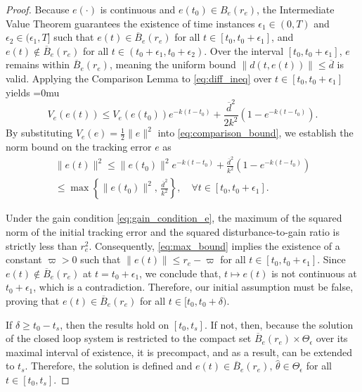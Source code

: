 \documentclass[conference]{ieeeconf}
\begin{document}
\begin{proof}
Because $e(\cdot)$ is continuous and $e(t_0) \in B_e(r_e)$, the Intermediate Value Theorem guarantees the existence of time instances $\epsilon_1 \in (0, T)$ and $\epsilon_2 \in (\epsilon_1, T]$ such that $e(t) \in \overline{B}_e(r_e)$ for all $t \in [t_0, t_0+\epsilon_1]$, and $e(t) \notin \overline{B}_e(r_e)$ for all $t \in (t_0+\epsilon_1, t_0+\epsilon_2)$. Over the interval $[t_0, t_0+\epsilon_1]$, $e$ remains within $\overline{B}_e(r_e)$, meaning the uniform bound $\|d(t,e(t))\| \le \overline{d}$ is valid. Applying the Comparison Lemma \cite[Lemma~3.4]{SCC.Khalil2002} to \eqref{eq:diff_ineq} over $t \in [t_0, t_0+\epsilon_1]$ yields
\begingroup\medmuskip=0mu\begin{equation}\label{eq:comparison_bound}
V_e(e(t)) \le V_e(e(t_0))e^{-k(t-t_0)} + \frac{\overline{d}^2}{2k^2} \left( 1 - e^{-k(t-t_0)} \right).
\end{equation}\endgroup
By substituting $V_e(e) = \frac{1}{2}\|e\|^2$ into \eqref{eq:comparison_bound}, we establish the norm bound on the tracking error $e$ as
\begin{multline}
\|e(t)\|^2 \le \|e(t_0)\|^2 e^{-k(t-t_0)} + \frac{\overline{d}^2}{k^2} \left( 1 - e^{-k(t-t_0)} \right)  \\
\le \max\left\{ \|e(t_0)\|^2, \, \frac{\overline{d}^2}{k^2} \right\}, \quad \forall t \in [t_0, t_0+\epsilon_1]. \label{eq:max_bound}
\end{multline}

Under the gain condition \eqref{eq:gain_condition_e}, the maximum of the squared norm of the initial tracking error and the squared disturbance-to-gain ratio is strictly less than $r_e^2$. Consequently, \eqref{eq:max_bound} implies the existence of a constant $\varpi > 0$ such that $\|e(t)\| \le r_e - \varpi$ for all $t \in [t_0, t_0+\epsilon_1]$. Since $e(t)\notin \overline{B}_e (r_e)$ at $t=t_0+ \epsilon_1$, we conclude that, $t \mapsto e(t)$ is not continuous at $t_0+\epsilon_1$, which is a contradiction. Therefore, our initial assumption must be false, proving that $e(t) \in \overline{B}_e(r_e)$ for all $t \in [t_0, t_0+\delta)$. 

If $\delta\ge t_0- t_s$, then the results hold on $[t_0, t_s]$. If not, then, because the solution of the closed loop system is restricted to the compact set $\overline{B}_e(r_e) \times \Theta_\epsilon$ over its maximal interval of existence, it is precompact, and as a result, can be extended to $t_s$. Therefore, the solution is defined and $e(t) \in \overline{B}_e(r_e), \, \hat \theta \in \Theta_\epsilon$ for all $t \in [t_0, t_{s}]$.


\end{proof}
\end{document}
